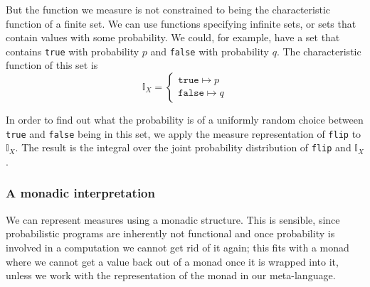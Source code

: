 \documentclass[11pt, leqno, titlepage]{article}
\theoremstyle{definition}
\begin{document}
But the function we measure is not constrained to being the characteristic function
of a finite set. We can use functions specifying infinite sets, or sets that contain
values with some probability. 
We could, for example, have a set that contains \texttt{true} with
probability $p$ and \texttt{false} with probability $q$.
The characteristic function of this set is
$$\mathbb{I}_X =
\begin{cases}
  \texttt{true} \mapsto p\\
  \texttt{false} \mapsto q
\end{cases}$$
 
In order to find out what the probability is of a uniformly random choice between
\texttt{true} and \texttt{false} being in this set, we apply the measure
representation of \texttt{flip} to $\mathbb{I}_X$. The result is the integral over
the joint probability distribution of \texttt{flip} and $\mathbb{I}_X$. 

\subsubsection{A monadic interpretation}
\label{sec:monad-interp}
We can represent measures using a monadic structure. This is sensible, since
probabilistic programs are inherently not functional and once probability is involved
in a computation we cannot get rid of it again; this fits with a monad where we cannot get a value back out of a monad once it is wrapped into it, unless we work with
the representation of the monad in our meta-language.
\end{document}
